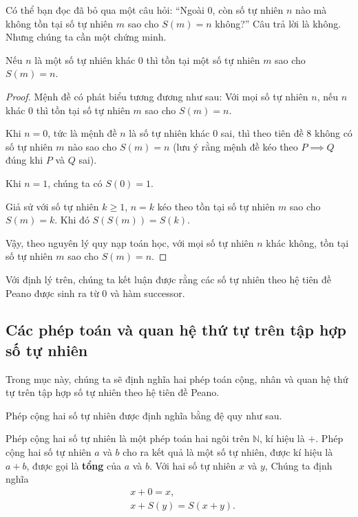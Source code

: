 Có thể bạn đọc đã bỏ qua một câu hỏi: ``Ngoài $0$, còn số tự nhiên $n$ nào mà không tồn tại số tự nhiên $m$ sao cho $S(m) = n$ không?\@'' Câu trả lời là không. Nhưng chúng ta cần một chứng minh.
\begin{theorem}\label{theorem:successor}
    Nếu $n$ là một số tự nhiên khác $0$ thì tồn tại một số tự nhiên $m$ sao cho $S(m) = n$.
\end{theorem}

\begin{proof}
    Mệnh đề có phát biểu tương đương như sau: Với mọi số tự nhiên $n$, nếu $n$ khác $0$ thì tồn tại số tự nhiên $m$ sao cho $S(m) = n$.

    Khi $n = 0$, tức là mệnh đề $n$ là số tự nhiên khác $0$ sai, thì theo tiên đề 8 không có số tự nhiên $m$ nào sao cho $S(m) = n$ (lưu ý rằng mệnh đề kéo theo $P\implies Q$ đúng khi $P$ và $Q$ sai).

    Khi $n = 1$, chúng ta có $S(0) = 1$.

    Giả sử với số tự nhiên $k\geq 1$, $n = k$ kéo theo tồn tại số tự nhiên $m$ sao cho $S(m) = k$. Khi đó $S(S(m)) = S(k)$.

    Vậy, theo nguyên lý quy nạp toán học, với mọi số tự nhiên $n$ khác không, tồn tại số tự nhiên $m$ sao cho $S(m) = n$.
\end{proof}

Với định lý trên, chúng ta kết luận được rằng các số tự nhiên theo hệ tiên đề Peano được sinh ra từ $0$ và hàm successor.

\subsection{Các phép toán và quan hệ thứ tự trên tập hợp số tự nhiên}

Trong mục này, chúng ta sẽ định nghĩa hai phép toán cộng, nhân và quan hệ thứ tự trên tập hợp số tự nhiên theo hệ tiên đề Peano.

Phép cộng hai số tự nhiên được định nghĩa bằng đệ quy như sau.
\begin{definition}
    Phép cộng hai số tự nhiên là một phép toán hai ngôi trên $\mathbb{N}$, kí hiệu là $+$. Phép cộng hai số tự nhiên $a$ và $b$ cho ra kết quả là một số tự nhiên, được kí hiệu là $a + b$, được gọi là \textbf{tổng} của $a$ và $b$. Với hai số tự nhiên $x$ và $y$, Chúng ta định nghĩa
    \begin{align*}
         & x + 0 = x,           \\
         & x + S(y) = S(x + y).
    \end{align*}
\end{definition}

